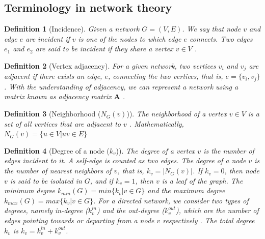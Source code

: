 \documentclass[10pt,a4paper]{article}
\newtheorem{defn}{Definition}
\begin{document}
\subsection{Terminology in network theory}
\begin{defn}[Incidence]
	Given a network $G=(V,E)$. We say that node $v$ and edge $e$ are incident if $v$ is one of the nodes to which edge $e$ connects. Two edges $e_1$ and $e_2$ are said to be incident if they share a vertex $v\in V$ \citep{newman2010networks}. 
\end{defn}

\begin{defn}[Vertex adjacency]
	For a given network, two vertices $v_i$ and $v_j$ are adjacent if there exists an edge, $e$, connecting the two vertices, that is, $e = \{v_i,v_j\}$. With the understanding of adjacency, we can represent a network using a matrix known as adjacency matrix $\mathbf{A}$ \citep{newman2010networks}.
\end{defn}

\begin{defn}[Neighborhood ($N_G(v)$)]
	The neighborhood of a vertex $v \in V$ is a set of all vertices that are adjacent to $v$ \citep{newman2010networks}. Mathematically, $N_G(v) = \{u \in V \vert uv \in E \}$
\end{defn}

\begin{defn}[Degree of a node ($k_v$)]
	The degree of a vertex $v$ is the number of edges incident to it. A self-edge is counted as two edges. The degree of a node $v$ is the number of nearest neighbors of $v$, that is, $k_v = |N_G(v)|$. If $k_v = 0$, then node $v$ is said to be isolated in $G$, and if $k_v = 1$, then $v$ is a leaf of the graph. The minimum degree $k_{min}(G)= min\{k_v \vert v \in G\} $ and the maximum degree $k_{max}(G)= max\{k_v \vert v \in G\}$. For a directed network, we consider two types of degrees, namely in-degree ($k_v^{in}$) and the out-degree ($k_v^{out}$), which are the number of edges pointing towards or departing from a node $v$ respectively \citep{estrada2011structure}. The total degree $k_v$ is $k_v = k_v^{in}+ k_v^{out}$.
\end{defn} 

\end{document}
